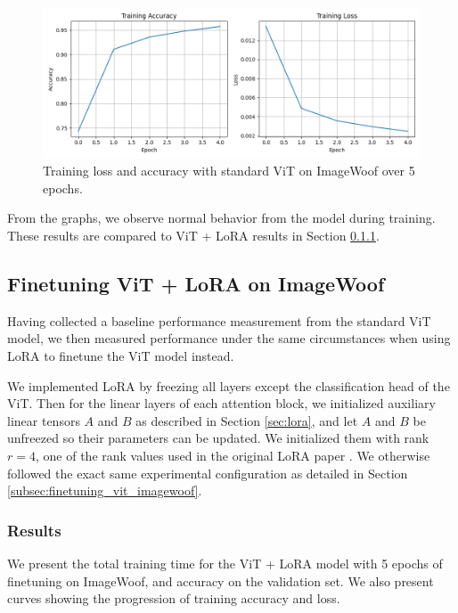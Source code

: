 \documentclass[10pt]{article}
\begin{document}
\begin{figure}[ht]
    \centering
    \includegraphics[width=1\linewidth]{images/training_loss_curve_vanilla.png}
    \caption{Training loss and accuracy with standard ViT on ImageWoof over 5 epochs.}
    \label{fig:placeholder}
\end{figure}

From the graphs, we observe normal behavior from the model during training. These results are compared to ViT + LoRA results in Section \ref{res_lora}.

\subsection{Finetuning ViT + LoRA on ImageWoof}

Having collected a baseline performance measurement from the standard ViT model, we then measured performance under the same circumstances when using LoRA to finetune the ViT model instead.

We implemented LoRA by freezing all layers except the classification head of the ViT. Then for the linear layers of each attention block, we initialized auxiliary linear tensors $A$ and $B$ as described in Section \ref{sec:lora}, and let $A$ and $B$ be unfreezed so their parameters can be updated. We initialized them with rank $r = 4$, one of the rank values used in the original LoRA paper \cite{hu2021loralowrankadaptationlarge}. We otherwise followed the exact same experimental configuration as detailed in Section \ref{subsec:finetuning_vit_imagewoof}.

\subsubsection{Results}
\label{res_lora}

We present the total training time for the ViT + LoRA model with 5 epochs of finetuning on ImageWoof, and accuracy on the validation set. We also present curves showing the progression of training accuracy and loss.
\end{document}

